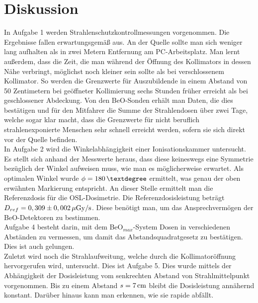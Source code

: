 \section{Diskussion}
In Aufgabe 1 werden Strahlenschutzkontrollmessungen vorgenommen. Die Ergebnisse fallen erwartungsgemäß aus. An der Quelle sollte man sich weniger lang aufhalten als in zwei Metern Entfernung am PC-Arbeitsplatz. Man lernt außerdem, dass die Zeit, die man während der Öffnung des Kollimators in dessen Nähe verbringt, möglichst noch kleiner sein sollte als bei verschlossenem Kollimator. So werden die Grenzwerte für Auszubildende in einem Abstand von 50 Zentimetern bei geöffneter Kollimierung sechs Stunden früher erreicht als bei geschlossener Abdeckung. 
Von den BeO-Sonden erhält man Daten, die dies bestätigen und für den \glqq Mitfahrer \grqq die Summe der Strahlendosen über zwei Tage, welche sogar klar macht, dass die Grenzwerte für nicht beruflich strahlenexponierte Menschen sehr schnell erreicht werden, sofern sie sich direkt vor der Quelle befinden.\\
In Aufgabe 2 wird die Winkelabhängigkeit einer Ionisationskammer untersucht. Es stellt sich anhand der Messwerte heraus, dass diese keineswegs eine Symmetrie bezüglich der Winkel aufweisen muss, wie man es möglicherweise erwartet. Als optimalen Winkel wurde $\phi = \unit[180]{°}$ ermittelt, was genau der oben erwähnten Markierung entspricht. An dieser Stelle ermittelt man die Referenzdosis für die OSL-Dosimetrie. Die Referenzdosisleistung beträgt $D_{ref} = \unit[0,309\pm0,002]{\mu Gy/s}$. Diese benötigt man, um das Ansprechvermögen der BeO-Detektoren zu bestimmen.\\
Aufgabe 4 besteht darin, mit dem BeO$_{max}$-System Dosen in verschiedenen Abständen zu vermessen, um damit das Abstandsquadratgesetz zu bestätigen. Dies ist auch gelungen.\\
Zuletzt wird noch die Strahlaufweitung, welche durch die Kollimatoröffnung hervorgerufen wird, untersucht. Dies ist Aufgabe 5. Dies wurde mittels der Abhängigkeit der Dosisleistung vom senkrechten Abstand von Strahlmittelpunkt vorgenommen. Bis zu einem Abstand $s = \unit[7]{cm}$ bleibt die Dosisleistung annähernd konstant. Darüber hinaus kann man erkennen, wie sie rapide abfällt. 


